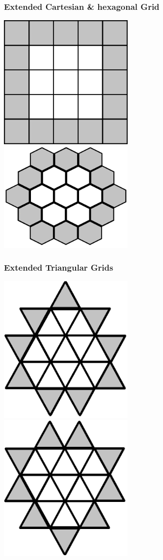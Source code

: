 \documentclass{beamer}
\begin{document}
\begin{frame}
\frametitle{Extended Cartesian \& hexagonal Grid}
\includegraphics[width=0.5\textwidth]{imgs/extendedcartesian.png}
\includegraphics[width=0.5\textwidth]{imgs/extendedhexagonal.png}
\end{frame}

\begin{frame}
\frametitle{Extended Triangular Grids}
\includegraphics[width=0.5\textwidth]{imgs/extendedtriangle1.png}
\includegraphics[width=0.5\textwidth]{imgs/extendedtriangle2.png}
\end{frame}
\end{document}
